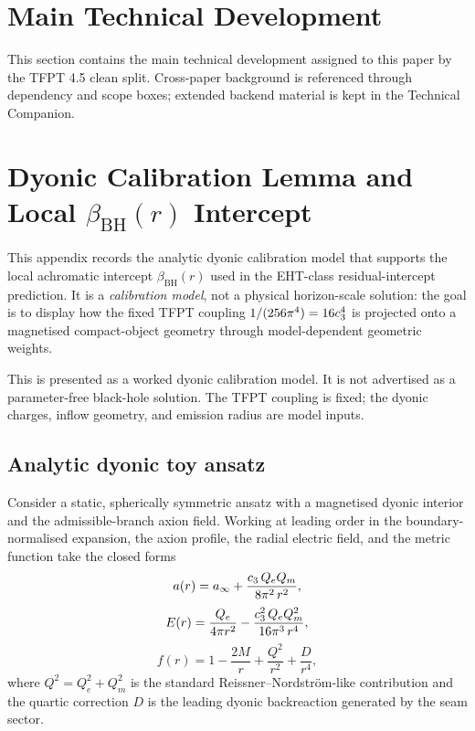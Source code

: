 \documentclass[11pt,a4paper]{article}
\begin{document}
\clearpage
\section{Main Technical Development}

This section contains the main technical development assigned to this paper by the TFPT 4.5 clean split. Cross-paper background is referenced through dependency and scope boxes; extended backend material is kept in the Technical Companion.



\clearpage
\section{Dyonic Calibration Lemma and Local $\beta_{\mathrm{BH}}(r)$ Intercept}
\label{app:dyonic-calibration}

This appendix records the analytic dyonic calibration model that supports the local achromatic
intercept $\beta_{\mathrm{BH}}(r)$ used in the EHT-class residual-intercept prediction. It is a
\emph{calibration model}, not a physical horizon-scale solution: the goal is to display how the
fixed TFPT coupling $1/(256\pi^4)=16c_3^4$ is projected onto a magnetised compact-object
geometry through model-dependent geometric weights.

\begin{tfptwarningbox}
This is presented as a worked dyonic calibration model. It is not advertised as a parameter-free
black-hole solution. The TFPT coupling is fixed; the dyonic charges, inflow geometry, and
emission radius are model inputs.
\end{tfptwarningbox}

\subsection{Analytic dyonic toy ansatz}

Consider a static, spherically symmetric ansatz with a magnetised dyonic interior and the
admissible-branch axion field. Working at leading order in the boundary-normalised expansion, the
axion profile, the radial electric field, and the metric function take the closed forms
\begin{equation}
\label{eq:dyonic-axion}
a(r)=a_\infty+\frac{c_3\,Q_e Q_m}{8\pi^2\,r^2},
\end{equation}
\begin{equation}
\label{eq:dyonic-E}
E(r)=\frac{Q_e}{4\pi r^2}-\frac{c_3^2\,Q_e Q_m^2}{16\pi^3\,r^4},
\end{equation}
\begin{equation}
\label{eq:dyonic-f}
f(r)=1-\frac{2M}{r}+\frac{Q^2}{r^2}+\frac{D}{r^4},
\end{equation}
where $Q^2=Q_e^2+Q_m^2$ is the standard Reissner--Nordström-like contribution and the quartic
correction $D$ is the leading dyonic backreaction generated by the seam sector.
\end{document}

